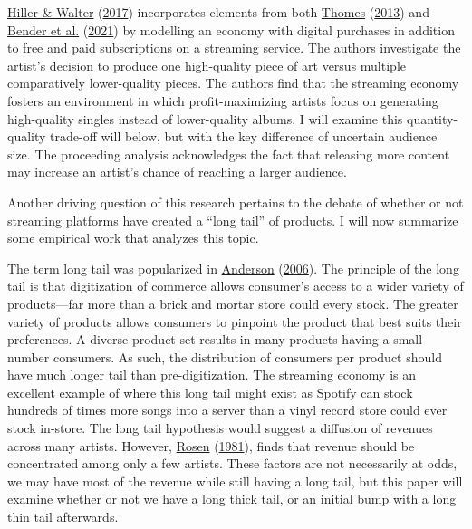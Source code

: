 \documentclass[
]{article}
\begin{document}
\protect\hyperlink{ref-hillerRiseStreamingMusic2017}{Hiller \& Walter}
(\protect\hyperlink{ref-hillerRiseStreamingMusic2017}{2017})
incorporates elements from both
\protect\hyperlink{ref-thomesEconomicAnalysisOnline2013}{Thomes}
(\protect\hyperlink{ref-thomesEconomicAnalysisOnline2013}{2013}) and
\protect\hyperlink{ref-benderAttractingArtistsMusic2021}{Bender et al.}
(\protect\hyperlink{ref-benderAttractingArtistsMusic2021}{2021}) by
modelling an economy with digital purchases in addition to free and paid
subscriptions on a streaming service. The authors investigate the
artist's decision to produce one high-quality piece of art versus
multiple comparatively lower-quality pieces. The authors find that the
streaming economy fosters an environment in which profit-maximizing
artists focus on generating high-quality singles instead of
lower-quality albums. I will examine this quantity-quality trade-off
will below, but with the key difference of uncertain audience size. The
proceeding analysis acknowledges the fact that releasing more content
may increase an artist's chance of reaching a larger audience.

Another driving question of this research pertains to the debate of
whether or not streaming platforms have created a ``long tail'' of
products. I will now summarize some empirical work that analyzes this
topic.

The term long tail was popularized in
\protect\hyperlink{ref-andersonLongTailWhy2006}{Anderson}
(\protect\hyperlink{ref-andersonLongTailWhy2006}{2006}). The principle
of the long tail is that digitization of commerce allows consumer's
access to a wider variety of products---far more than a brick and mortar
store could every stock. The greater variety of products allows
consumers to pinpoint the product that best suits their preferences. A
diverse product set results in many products having a small number
consumers. As such, the distribution of consumers per product should
have much longer tail than pre-digitization. The streaming economy is an
excellent example of where this long tail might exist as Spotify can
stock hundreds of times more songs into a server than a vinyl record
store could ever stock in-store. The long tail hypothesis would suggest
a diffusion of revenues across many artists. However,
\protect\hyperlink{ref-rosenEconomicsSuperstars1981a}{Rosen}
(\protect\hyperlink{ref-rosenEconomicsSuperstars1981a}{1981}), finds
that revenue should be concentrated among only a few artists. These
factors are not necessarily at odds, we may have most of the revenue
while still having a long tail, but this paper will examine whether or
not we have a long thick tail, or an initial bump with a long thin tail
afterwards.
\end{document}
